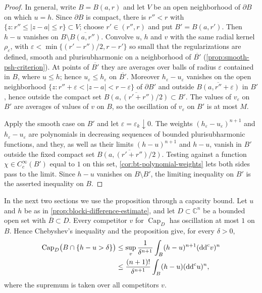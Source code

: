 \begin{proof}
In general, write $B=B(a,r)$ and let $V$ be an open neighborhood of $\partial B$ on which $u=h$. Since $\partial B$ is compact, there is $r''<r$ with $\{z:r''\le|z-a|\le r\}\subset V$; choose $r'\in(r'',r)$ and put $B'=B(a,r')$. Then $h-u$ vanishes on $B\setminus\overline{B(a,r'')}$. Convolve $u$, $h$ and $v$ with the same radial kernel $\rho_\varepsilon$, with $\varepsilon<\min\{(r'-r'')/2,r-r'\}$ so small that the regularizations are defined, smooth and plurisubharmonic on a neighborhood of $\overline{B'}$ (\cref{prop:smooth-psh-criterion}). At points of $\overline{B'}$ they are averages over balls of radius $\varepsilon$ contained in $B$, where $u\le h$; hence $u_\varepsilon\le h_\varepsilon$ on $\overline{B'}$. Moreover $h_\varepsilon-u_\varepsilon$ vanishes on the open neighborhood $\{z:r''+\varepsilon<|z-a|<r-\varepsilon\}$ of $\partial B'$ and outside $\overline{B(a,r''+\varepsilon)}$ in $B'$, hence outside the compact set $\overline{B(a,(r'+r'')/2)}\subset B'$. The values of $v_\varepsilon$ on $B'$ are averages of values of $v$ on $B$, so the oscillation of $v_\varepsilon$ on $B'$ is at most $M$.

Apply the smooth case on $B'$ and let $\varepsilon=\varepsilon_k\downarrow0$. The weights $(h_\varepsilon-u_\varepsilon)^{n+1}$ and $h_\varepsilon-u_\varepsilon$ are polynomials in decreasing sequences of bounded plurisubharmonic functions, and they, as well as their limits $(h-u)^{n+1}$ and $h-u$, vanish in $B'$ outside the fixed compact set $\overline{B(a,(r'+r'')/2)}$. Testing against a function $\chi\in C^\infty_c(B')$ equal to $1$ on this set, \cref{cor:bt-polynomial-weights} lets both sides pass to the limit. Since $h-u$ vanishes on $B\setminus B'$, the limiting inequality on $B'$ is the asserted inequality on $B$.
\end{proof}

In the next two sections we use the proposition through a capacity bound. Let $u$ and $h$ be as in \cref{prop:blocki-difference-estimate}, and let $D\subset\mathbb C^n$ be a bounded open set with $\overline B\subset D$. Every competitor $v$ for $\operatorname{Cap}_D$ has oscillation at most $1$ on $B$. Hence Chebyshev's inequality and the proposition give, for every $\delta>0$,
\begin{equation}\label{eq:blocki-capacity-bound}
 \begin{aligned}
 \operatorname{Cap}_D\bigl(B\cap\{h-u>\delta\}\bigr)
 &\le\sup_v\frac{1}{\delta^{n+1}}\int_B(h-u)^{n+1}(\mathrm{dd}^{\mathrm{c}} v)^n\\
 &\le\frac{(n+1)!}{\delta^{n+1}}\int_B(h-u)(\mathrm{dd}^{\mathrm{c}} u)^n,
 \end{aligned}
\end{equation}
where the supremum is taken over all competitors $v$.

